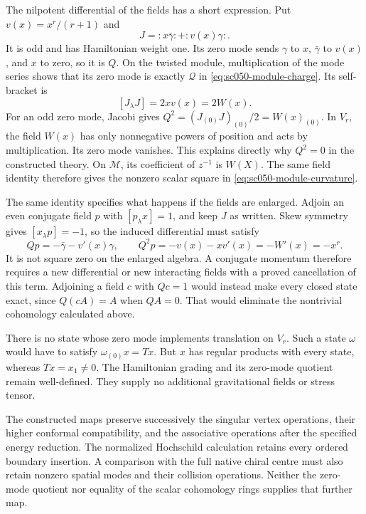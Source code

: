 The nilpotent differential of the fields has a short expression.
Put \(v(x)=x^r/(r+1)\) and
\[
 J=:x\bar\gamma:+:v(x)\gamma:.
\]
It is odd and has Hamiltonian weight one. Its zero mode sends
\(\gamma\) to \(x\), \(\bar\gamma\) to \(v(x)\), and \(x\) to
zero, so it is \(Q\). On the twisted module, multiplication of
the mode series shows that its zero mode is exactly
\(\mathcal Q\) in \eqref{eq:sc050-module-charge}.
Its self-bracket is
\[
 [J_\lambda J]=2xv(x)=2W(x).
\]
For an odd zero mode, Jacobi gives
\(Q^2=(J_{(0)}J)_{(0)}/2=W(x)_{(0)}\).
In \(V_r\), the field \(W(x)\) has only nonnegative powers of
position and acts by multiplication. Its zero mode vanishes.
This explains directly why \(Q^2=0\) in the constructed theory.
On \(\mathcal M\), its coefficient of \(z^{-1}\) is \(W(X)\).
The same field identity therefore gives the nonzero scalar
square in \eqref{eq:sc050-module-curvature}.

The same identity specifies what happens if the fields are
enlarged. Adjoin an even conjugate field \(p\) with
\([p_\lambda x]=1\), and keep \(J\) as written.
Skew symmetry gives \([x_\lambda p]=-1\), so the induced
differential must satisfy
\[
 Qp=-\bar\gamma-v'(x)\gamma,\qquad
 Q^2p=-v(x)-xv'(x)=-W'(x)=-x^r.
\]
It is not square zero on the enlarged algebra. A conjugate
momentum therefore requires a new differential or new
interacting fields with a proved cancellation of this term.
Adjoining a field \(c\) with \(Qc=1\) would instead make every
closed state exact, since \(Q(cA)=A\) when \(QA=0\).
That would eliminate the nontrivial cohomology calculated above.

There is no state whose zero mode implements translation on
\(V_r\). Such a state \(\omega\) would have to
satisfy \(\omega_{(0)}x=Tx\). But \(x\) has regular products
with every state, whereas \(Tx=x_1\ne0\). The Hamiltonian
grading and its zero-mode quotient remain well-defined.
They supply no additional gravitational fields or stress tensor.

The constructed maps preserve successively the singular vertex
operations, their higher conformal compatibility, and the
associative operations after the specified energy reduction.
The normalized Hochschild calculation retains every ordered
boundary insertion. A comparison with the full native chiral
centre must also retain nonzero spatial modes and their collision
operations. Neither the zero-mode quotient nor equality of the
scalar cohomology rings supplies that further map.
